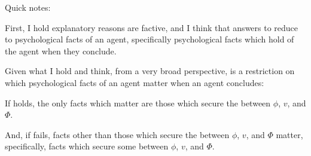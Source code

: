 \begin{note}
  Quick notes:

  First, I hold explanatory reasons are factive, and I think that answers to \qWhy{} reduce to psychological facts of an agent, specifically psychological facts which hold of the agent when they conclude.%


  Given what I hold and think, from a very broad perspective, \issueInclusion{} is a restriction on which psychological facts of an agent matter when an agent concludes:

  If \issueInclusion{} holds, the only facts which matter are those which secure the \ros{} between \(\phi\), \(v\), and \(\Phi\).

  And, if \issueInclusion{} fails, facts other than those which secure the \ros{} between \(\phi\), \(v\), and \(\Phi\) matter, specifically, facts which secure some \ros{} between \(\phi\), \(v\), and \(\Phi\).
\end{note}



